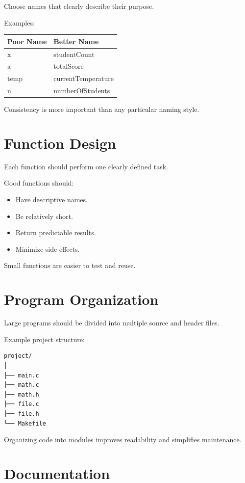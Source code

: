 \documentclass[12pt,openany]{book}
\begin{document}
Choose names that clearly describe their purpose.

Examples:

\begin{center}
\begin{tabular}{|l|l|}
\hline
Poor Name & Better Name \\
\hline
x & studentCount \\
a & totalScore \\
temp & currentTemperature \\
n & numberOfStudents \\
\hline
\end{tabular}
\end{center}

Consistency is more important than any particular naming style.

\section{Function Design}

Each function should perform one clearly defined task.

Good functions should:

\begin{itemize}
    \item Have descriptive names.
    \item Be relatively short.
    \item Return predictable results.
    \item Minimize side effects.
\end{itemize}

Small functions are easier to test and reuse.
\section{Program Organization}

Large programs should be divided into multiple source and header files.

Example project structure:

\begin{lstlisting}
project/
│
├── main.c
├── math.c
├── math.h
├── file.c
├── file.h
└── Makefile
\end{lstlisting}

Organizing code into modules improves readability and simplifies maintenance.

\section{Documentation}
\end{document}
